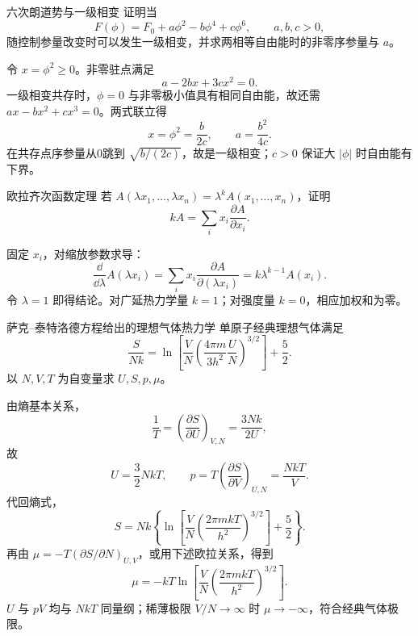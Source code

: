 {\begin{advexamplebox}{六次朗道势与一级相变}\label{advA2:ex:landau-first-order}
证明当
\[
 F(\phi)=F_0+a\phi^2-b\phi^4+c\phi^6,
 \qquad a,b,c>0,
\]
随控制参量改变时可以发生一级相变，并求两相等自由能时的非零序参量与 $a$。

\AQLandau
\end{advexamplebox}
\begin{advsolution}
\AALandau

令 $x=\phi^2\ge0$。非零驻点满足
\[
 a-2bx+3cx^2=0.
\]
一级相变共存时，$\phi=0$ 与非零极小值具有相同自由能，故还需
$ax-bx^2+cx^3=0$。两式联立得
\[
 \boxed{x=\phi^2=\frac b{2c}},
 \qquad
 \boxed{a=\frac{b^2}{4c}}.
\]
在共存点序参量从0跳到 $\sqrt{b/(2c)}$，故是一级相变；$c>0$ 保证大 $|\phi|$ 时自由能有下界。


\end{advsolution}

}

\begin{advexamplebox}{欧拉齐次函数定理}\label{advA2:ex:euler-homogeneous}
若 $A(\lambda x_1,\ldots,\lambda x_n)=\lambda^kA(x_1,\ldots,x_n)$，证明
\[
 \boxed{kA=\sum_i x_i\frac{\partial A}{\partial x_i}}.
\]

\AQHomogeneous
\end{advexamplebox}
\begin{advsolution}
\AAHomogeneous

固定 $x_i$，对缩放参数求导：
\[
 \frac{\dd}{\dd\lambda}A(\lambda x_i)
 =\sum_i x_i\frac{\partial A}{\partial(\lambda x_i)}
 =k\lambda^{k-1}A(x_i).
\]
令 $\lambda=1$ 即得结论。对广延热力学量 $k=1$；对强度量 $k=0$，相应加权和为零。
\end{advsolution}

\begin{advexamplebox}{萨克--泰特洛德方程给出的理想气体热力学}\label{advA2:ex:sackur-tetrode}
单原子经典理想气体满足
\[
 \frac{S}{Nk}=\ln\!\left[
 \frac VN\left(\frac{4\pi m}{3h^2}\frac UN\right)^{3/2}
 \right]+\frac52.
\]
以 $N,V,T$ 为自变量求 $U,S,p,\mu$。

\AQSackur
\end{advexamplebox}
\begin{advsolution}
\AASackur

由熵基本关系，
\[
 \frac1T=\left(\frac{\partial S}{\partial U}\right)_{V,N}
 =\frac{3Nk}{2U},
\]
故
\[
 \boxed{U=\frac32NkT},\qquad
 \boxed{p=T\left(\frac{\partial S}{\partial V}\right)_{U,N}
 =\frac{NkT}{V}}.
\]
代回熵式，
\[
 \boxed{S=Nk\left\{\ln\!\left[
 \frac VN\left(\frac{2\pi mkT}{h^2}\right)^{3/2}\right]+\frac52\right\}}.
\]
再由 $\mu=-T(\partial S/\partial N)_{U,V}$，或用下述欧拉关系，得到
\[
 \boxed{\mu=-kT\ln\!\left[
 \frac VN\left(\frac{2\pi mkT}{h^2}\right)^{3/2}\right]}.
\]
$U$ 与 $pV$ 均与 $NkT$ 同量纲；稀薄极限 $V/N\to\infty$ 时 $\mu\to-\infty$，符合经典气体极限。
\end{advsolution}

